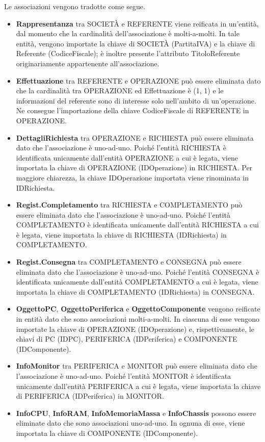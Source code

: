 \documentclass[a4paper,12pt]{report}
\begin{document}
Le associazioni vengono tradotte come segue.
\begin{itemize}
	\item \textbf{Rappresentanza} tra SOCIETÀ e REFERENTE viene reificata in un'entità, dal momento che la cardinalità dell'associazione è molti-a-molti. In tale entità, vengono importate la chiave di SOCIETÀ (PartitaIVA) e la chiave di Referente (CodiceFiscale); è inoltre presente l'attributo TitoloReferente originariamente appartenente all'associazione.
	\item \textbf{Effettuazione} tra REFERENTE e OPERAZIONE può essere eliminata dato che la cardinalità tra OPERAZIONE ed Effettuazione è (1, 1) e le informazioni del referente sono di interesse solo nell'ambito di un'operazione. Ne consegue l'importazione della chiave CodiceFiscale di REFERENTE in OPERAZIONE.
	\item \textbf{DettagliRichiesta} tra OPERAZIONE e RICHIESTA può essere eliminata dato che l'associazione è uno-ad-uno. Poiché l'entità RICHIESTA è identificata unicamente dall'entità OPERAZIONE a cui è legata, viene importata la chiave di OPERAZIONE (IDOperazione) in RICHIESTA. Per maggiore chiarezza, la chiave IDOperazione importata viene rinominata in IDRichiesta.
	\item \textbf{Regist.Completamento} tra RICHIESTA e COMPLETAMENTO può essere eliminata dato che l'associazione è uno-ad-uno. Poiché l'entità COMPLETAMENTO è identificata unicamente dall'entità RICHIESTA a cui è legata, viene importata la chiave di RICHIESTA (IDRichiesta) in COMPLETAMENTO.
	\item \textbf{Regist.Consegna} tra COMPLETAMENTO e CONSEGNA può essere eliminata dato che l'associazione è uno-ad-uno. Poiché l'entità CONSEGNA è identificata unicamente dall'entità COMPLETAMENTO a cui è legata, viene importata la chiave di COMPLETAMENTO (IDRichiesta) in CONSEGNA.
	\item \textbf{OggettoPC}, \textbf{OggettoPeriferica} e \textbf{OggettoComponente} vengono reificate in entità dato che sono associazioni molti-a-molti. In ciascuna di esse vengono importate la chiave di OPERAZIONE (IDOperazione) e, rispettivamente, le chiavi di PC (IDPC), PERIFERICA (IDPeriferica) e COMPONENTE (IDComponente).
	\item \textbf{InfoMonitor} tra PERIFERICA e MONITOR può essere eliminata dato che l'associazione è uno-ad-uno. Poiché l'entità MONITOR è identificata unicamente dall'entità PERIFERICA a cui è legata, viene importata la chiave di PERIFERICA (IDPeriferica) in MONITOR.
	\item \textbf{InfoCPU}, \textbf{InfoRAM}, \textbf{InfoMemoriaMassa} e \textbf{InfoChassis} possono essere eliminate dato che sono associazioni uno-ad-uno. In ognuna di esse, viene importata la chiave di COMPONENTE (IDComponente).

\end{itemize}
\end{document}
